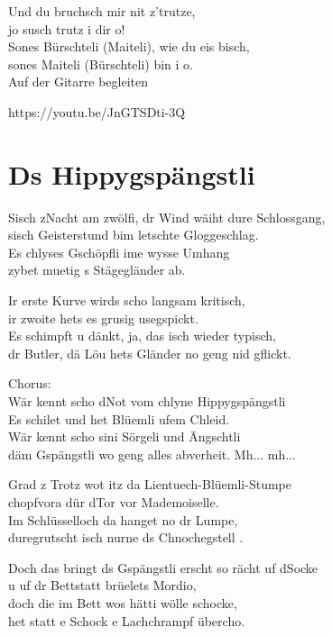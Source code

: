 \documentclass[
  letterpaper,
  twoside=false]{scrbook}
\begin{document}
Und du bruchsch mir nit z'trutze,\\
jo susch trutz i dir o!\\
Sones Bürschteli (Maiteli), wie du eis bisch,\\
sones Maiteli (Bürschteli) bin i o.\\
Auf der Gitarre begleiten

https://youtu.be/JnGTSDti-3Q

\hypertarget{ds-hippygspuxe4ngstli}{%
\chapter{Ds Hippygspängstli}\label{ds-hippygspuxe4ngstli}}

S\textquotesingle isch z\textquotesingle Nacht am zwölfi, dr Wind wäiht
dure Schlossgang,\\
s\textquotesingle isch Geisterstund bim letschte Gloggeschlag.\\
Es chlyses Gschöpfli ime wysse Umhang\\
zybet muetig s Stägegländer ab.

Ir erste Kurve wird\textquotesingle s scho langsam kritisch,\\
ir zwoite hets es grusig usegspickt.\\
Es schimpft u dänkt, ja, das isch wieder typisch,\\
dr Butler, dä Löu het\textquotesingle s Gländer no geng nid gflickt.

Chorus:\\
Wär kennt scho d\textquotesingle Not vom chlyne Hippygspängstli\\
Es schilet und het Blüemli ufem Chleid.\\
Wär kennt scho sini Sörgeli und Ängschtli\\
däm Gspängstli wo geng alles abverheit. Mh... mh...

Grad z Trotz wot itz da Lientuech-Blüemli-Stumpe\\
chopfvora dür d\textquotesingle Tor vor Mademoiselle.\\
Im Schlüsselloch da hanget no dr Lumpe,\\
duregrutscht isch nurne ds Chnochegstell .

Doch das bringt ds Gspängstli erscht so rächt uf
d\textquotesingle Socke\\
u uf dr Bettstatt brüelet\textquotesingle s Mordio,\\
doch die im Bett wo\textquotesingle s hätti wölle schocke,\\
het statt e Schock e Lachchrampf übercho.
\end{document}
